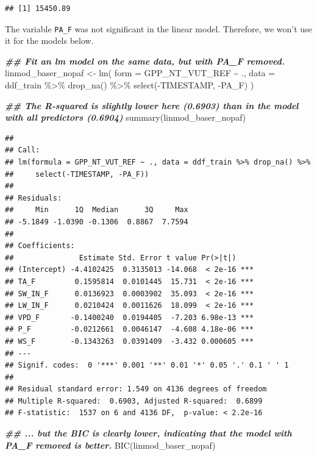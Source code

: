\documentclass[
]{book}
\newenvironment{Shaded}{\begin{snugshade}}{\end{snugshade}}
\newcommand{\AttributeTok}[1]{\textcolor[rgb]{0.77,0.63,0.00}{#1}}
\newcommand{\DocumentationTok}[1]{\textcolor[rgb]{0.56,0.35,0.01}{\textbf{\textit{#1}}}}
\newcommand{\FunctionTok}[1]{\textcolor[rgb]{0.00,0.00,0.00}{#1}}
\newcommand{\NormalTok}[1]{#1}
\newcommand{\OtherTok}[1]{\textcolor[rgb]{0.56,0.35,0.01}{#1}}
\newcommand{\SpecialCharTok}[1]{\textcolor[rgb]{0.00,0.00,0.00}{#1}}
\begin{document}
\begin{verbatim}
## [1] 15450.89
\end{verbatim}

The variable \texttt{PA\_F} was not significant in the linear model. Therefore, we won't use it for the models below.

\begin{Shaded}
\begin{Highlighting}[]
\DocumentationTok{\#\# Fit an lm model on the same data, but with PA\_F removed.}
\NormalTok{linmod\_baser\_nopaf }\OtherTok{\textless{}{-}} \FunctionTok{lm}\NormalTok{(}
  \AttributeTok{form =}\NormalTok{ GPP\_NT\_VUT\_REF }\SpecialCharTok{\textasciitilde{}}\NormalTok{ ., }
  \AttributeTok{data =}\NormalTok{ ddf\_train }\SpecialCharTok{\%\textgreater{}\%} 
    \FunctionTok{drop\_na}\NormalTok{() }\SpecialCharTok{\%\textgreater{}\%} 
    \FunctionTok{select}\NormalTok{(}\SpecialCharTok{{-}}\NormalTok{TIMESTAMP, }\SpecialCharTok{{-}}\NormalTok{PA\_F)}
\NormalTok{)}

\DocumentationTok{\#\# The R{-}squared is slightly lower here (0.6903) than in the model with all predictors (0.6904)}
\FunctionTok{summary}\NormalTok{(linmod\_baser\_nopaf)}
\end{Highlighting}
\end{Shaded}

\begin{verbatim}
## 
## Call:
## lm(formula = GPP_NT_VUT_REF ~ ., data = ddf_train %>% drop_na() %>% 
##     select(-TIMESTAMP, -PA_F))
## 
## Residuals:
##     Min      1Q  Median      3Q     Max 
## -5.1849 -1.0390 -0.1306  0.8867  7.7594 
## 
## Coefficients:
##               Estimate Std. Error t value Pr(>|t|)    
## (Intercept) -4.4102425  0.3135013 -14.068  < 2e-16 ***
## TA_F         0.1595814  0.0101445  15.731  < 2e-16 ***
## SW_IN_F      0.0136923  0.0003902  35.093  < 2e-16 ***
## LW_IN_F      0.0210424  0.0011626  18.099  < 2e-16 ***
## VPD_F       -0.1400240  0.0194405  -7.203 6.98e-13 ***
## P_F         -0.0212661  0.0046147  -4.608 4.18e-06 ***
## WS_F        -0.1343263  0.0391409  -3.432 0.000605 ***
## ---
## Signif. codes:  0 '***' 0.001 '**' 0.01 '*' 0.05 '.' 0.1 ' ' 1
## 
## Residual standard error: 1.549 on 4136 degrees of freedom
## Multiple R-squared:  0.6903, Adjusted R-squared:  0.6899 
## F-statistic:  1537 on 6 and 4136 DF,  p-value: < 2.2e-16
\end{verbatim}

\begin{Shaded}
\begin{Highlighting}[]
\DocumentationTok{\#\# ... but the BIC is clearly lower, indicating that the model with PA\_F removed is better.}
\FunctionTok{BIC}\NormalTok{(linmod\_baser\_nopaf)}
\end{Highlighting}
\end{Shaded}
\end{document}
